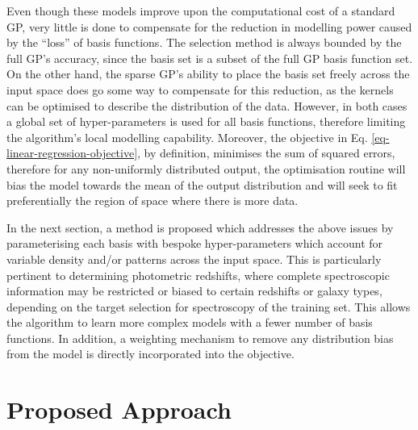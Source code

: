 \documentclass[useAMS,usenatbib,fleqn]{mn2e}
\begin{document}
Even though these models improve upon the computational cost of a standard GP, very little is done to compensate for the reduction in modelling power caused by the ``loss'' of basis functions. The selection method is always bounded by the full GP's accuracy, since the basis set is a subset of the full GP basis function set. On the other hand, the sparse GP's ability to place the basis set freely across the input space does go some way to compensate for this reduction, as the kernels can be optimised to describe the distribution of the data. However, in both cases a global set of hyper-parameters is used for all basis functions, therefore limiting the algorithm's local modelling capability. Moreover, the objective in Eq. \eqref{eq-linear-regression-objective}, by definition, minimises the sum of squared errors, therefore for any non-uniformly distributed output, the optimisation routine will bias the model towards the mean of the output distribution and will seek to fit preferentially the region of space where there is more data.

In the next section, a method is proposed which addresses the above issues by parameterising each basis with bespoke hyper-parameters which account for variable density and/or patterns across the input space. This is particularly pertinent to determining photometric redshifts, where complete spectroscopic information may be restricted or biased to certain redshifts or galaxy types, depending on the target selection for spectroscopy of the training set.
This allows the algorithm to learn more complex models with a fewer number of basis functions. In addition, a weighting mechanism to remove any distribution bias from the model is directly incorporated into the objective.

\section{Proposed Approach}
\label{sec-proposed-approach}
\end{document}
